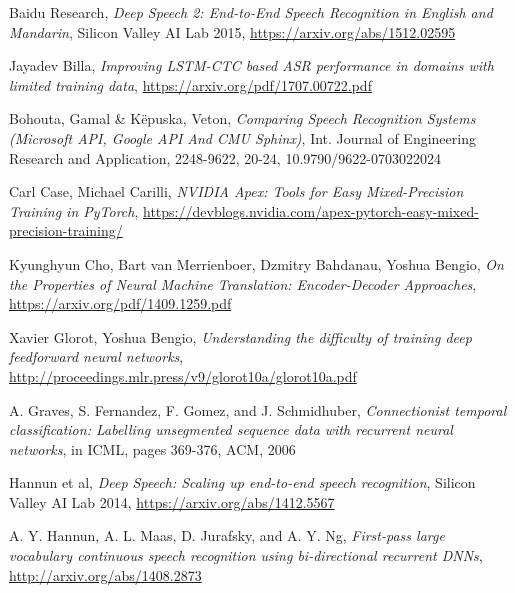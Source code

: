 \documentclass[licencjacka,en]{pracamgr}
\begin{document}
	\begin{thebibliography}{99}

		 Baidu Research, \textit{Deep Speech 2: End-to-End Speech Recognition in English and Mandarin}, Silicon Valley AI Lab 2015, \href{https://arxiv.org/abs/1512.02595}{https://arxiv.org/abs/1512.02595}

		 Jayadev Billa, \textit{Improving LSTM-CTC based ASR performance in domains with limited training data}, 
		\href{https://arxiv.org/pdf/1707.00722.pdf}{https://arxiv.org/pdf/1707.00722.pdf}

		 Bohouta, Gamal \& Këpuska, Veton, \textit{Comparing Speech Recognition Systems (Microsoft API, Google API And CMU Sphinx)}, Int. Journal of Engineering Research and Application, 2248-9622, 20-24, 10.9790/9622-0703022024

		Carl Case, Michael Carilli, \textit{NVIDIA Apex: Tools for Easy Mixed-Precision Training in PyTorch}, 
		\href{https://devblogs.nvidia.com/apex-pytorch-easy-mixed-precision-training/}{https://devblogs.nvidia.com/apex-pytorch-easy-mixed-precision-training/}

		 Kyunghyun Cho, Bart van Merrienboer, Dzmitry Bahdanau, Yoshua Bengio, \textit{On the Properties of Neural Machine Translation: Encoder-Decoder Approaches},  \href{https://arxiv.org/pdf/1409.1259.pdf}{https://arxiv.org/pdf/1409.1259.pdf}

		 Xavier Glorot, Yoshua Bengio, \textit{Understanding the difficulty of training deep feedforward neural networks},  \href{http://proceedings.mlr.press/v9/glorot10a/glorot10a.pdf}{http://proceedings.mlr.press/v9/glorot10a/glorot10a.pdf}

		 A. Graves, S. Fernandez, F. Gomez, and J. Schmidhuber, \textit{Connectionist temporal classification:
			Labelling unsegmented sequence data with recurrent neural networks}, in ICML, pages 369-376, ACM, 2006

		 Hannun et al,
		\textit{Deep Speech: Scaling up end-to-end speech recognition}, Silicon Valley AI Lab 2014, \href{https://arxiv.org/abs/1412.5567}{https://arxiv.org/abs/1412.5567}

		 A. Y. Hannun, A. L. Maas, D. Jurafsky, and A. Y. Ng, \textit{First-pass large vocabulary continuous speech recognition using bi-directional recurrent DNNs}, \href{http://arxiv.org/abs/1408.2873}{http://arxiv.org/abs/1408.2873}


\end{thebibliography}
\end{document}
